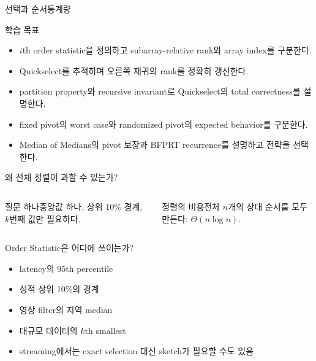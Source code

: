 \begin{frame}[plain]
\vfill{\color{AlgoBlue}선택과 순서통계량\par}
\vspace{1mm}{\Large Selection and Order Statistics\par}
\vspace{3mm}{\color{AlgoOrange}\rule{38mm}{1.2pt}\par}
\vspace{5mm}{\large Quickselect에서 Median of Medians까지\par}
\vspace{8mm}{\small Algorithm Lecture Notes\par}\vfill
\end{frame}
\begin{frame}{학습 목표}
\begin{itemize}
  \item $i$th order statistic을 정의하고 subarray-relative rank와 array index를 구분한다.
  \item Quickselect를 추적하며 오른쪽 재귀의 rank를 정확히 갱신한다.
  \item partition property와 recursive invariant로 Quickselect의 total correctness를 설명한다.
  \item fixed pivot의 worst case와 randomized pivot의 expected behavior를 구분한다.
  \item Median of Medians의 pivot 보장과 BFPRT recurrence를 설명하고 전략을 선택한다.
\end{itemize}
\end{frame}
\begin{frame}{왜 전체 정렬이 과할 수 있는가?}
\begin{columns}[T]\begin{block}{질문 하나}중앙값 하나, 상위 10\% 경계, $k$번째 값만 필요하다.\end{block}\begin{alertblock}{정렬의 비용}전체 $n$개의 상대 순서를 모두 만든다: $\Theta(n\log n)$.\end{alertblock}\end{columns}
\end{frame}
\begin{frame}{Order Statistic은 어디에 쓰이는가?}
\begin{itemize}\item latency의 95th percentile\item 성적 상위 10\%의 경계\item 영상 filter의 지역 median\item 대규모 데이터의 $k$th smallest\item streaming에서는 exact selection 대신 sketch가 필요할 수도 있음\end{itemize}
\end{frame}
